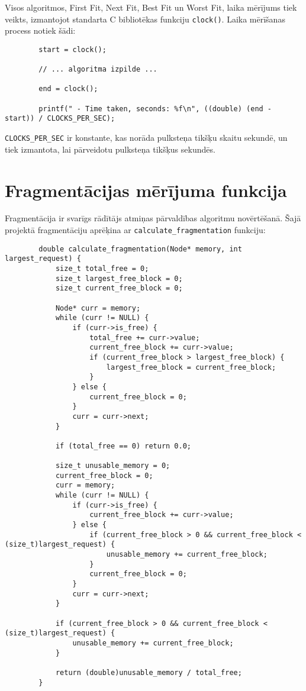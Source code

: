 \documentclass{report}
\begin{document}
	Visos algoritmos, First Fit, Next Fit, Best Fit un Worst Fit, laika mērījums tiek veikts, izmantojot standarta C bibliotēkas funkciju \texttt{clock()}. Laika mērīšanas process notiek šādi:
	
	\begin{verbatim}
		start = clock();
		
		// ... algoritma izpilde ...
		
		end = clock();
		
		printf(" - Time taken, seconds: %f\n", ((double) (end - start)) / CLOCKS_PER_SEC);
	\end{verbatim}
	
	\texttt{CLOCKS\_PER\_SEC} ir konstante, kas norāda pulksteņa tikšķu skaitu sekundē, un tiek izmantota, lai pārveidotu pulksteņa tikšķus sekundēs.
	
	\section{Fragmentācijas mērījuma funkcija}
	
	Fragmentācija ir svarīgs rādītājs atmiņas pārvaldības algoritmu novērtēšanā. Šajā projektā fragmentāciju aprēķina ar \texttt{calculate\_fragmentation} funkciju:
	
	\begin{verbatim}
		double calculate_fragmentation(Node* memory, int largest_request) {
			size_t total_free = 0;
			size_t largest_free_block = 0;
			size_t current_free_block = 0;
			
			Node* curr = memory;
			while (curr != NULL) {
				if (curr->is_free) {
					total_free += curr->value;
					current_free_block += curr->value;
					if (current_free_block > largest_free_block) {
						largest_free_block = current_free_block;
					}
				} else {
					current_free_block = 0;
				}
				curr = curr->next;
			}
			
			if (total_free == 0) return 0.0;
			
			size_t unusable_memory = 0;
			current_free_block = 0;
			curr = memory;
			while (curr != NULL) {
				if (curr->is_free) {
					current_free_block += curr->value;
				} else {
					if (current_free_block > 0 && current_free_block < (size_t)largest_request) {
						unusable_memory += current_free_block;
					}
					current_free_block = 0;
				}
				curr = curr->next;
			}
			
			if (current_free_block > 0 && current_free_block < (size_t)largest_request) {
				unusable_memory += current_free_block;
			}
			
			return (double)unusable_memory / total_free;
		}
	\end{verbatim}
	
\end{document}
